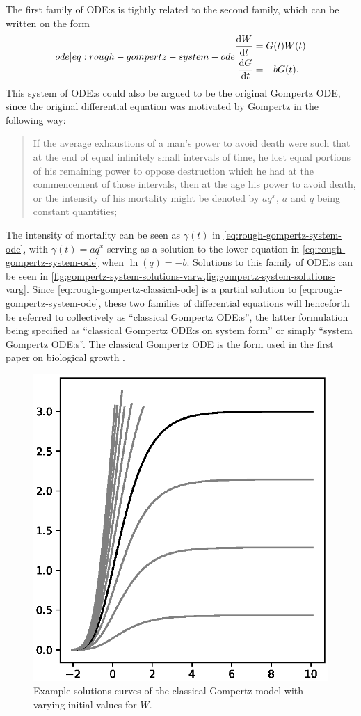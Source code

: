 The first family of ODE:s is tightly related to the second family, which can be written on the form
\begin{equation}
  \label[ode]{eq:rough-gompertz-system-ode}
  \begin{aligned} 
    \diff{W}{t} &= G(t) W(t)\\
    \diff{G}{t} &= -b G(t).
  \end{aligned}
\end{equation}
This system of ODE:s could also be argued to be the original Gompertz ODE, since the original differential equation  was motivated by Gompertz in the following way:
\blockquote[{\cite[518]{gompertz1825nature}}]{
  If the average exhaustions of a man's power to avoid death were such that at the end of equal infinitely small intervals of time, he lost equal portions of his remaining power to oppose destruction which he had at the commencement of those intervals, then at the age his power to avoid death, or the intensity of his mortality might be denoted by \(aq^x\), \(a\) and \(q\) being constant quantities;
}
The intensity of mortality can be seen as \(\gamma(t)\) in \cref{eq:rough-gompertz-system-ode}, with \(\gamma(t) = aq^x\) serving as a solution to the lower equation in \cref{eq:rough-gompertz-system-ode} when \(\ln\left(q\right) = -b\).
Solutions to this family of ODE:s can be seen in \cref{fig:gompertz-system-solutions-varw,fig:gompertz-system-solutions-varg}.
Since \cref{eq:rough-gompertz-classical-ode} is a partial solution to \cref{eq:rough-gompertz-system-ode}, these two families of differential equations will henceforth be referred to collectively as \enquote{classical Gompertz ODE:s}, the latter formulation being specified as \enquote{classical Gompertz ODE:s on system form} or simply \enquote{system Gompertz ODE:s}.
The classical Gompertz ODE is the form used in the first paper on biological growth \cite{davidson1928growth}.
\begin{figure}
  \centering
  \includegraphics[width=.32\textwidth]{images/gompertz-classical-solutions}
  \caption{Example solutions curves of the classical Gompertz model with varying initial values for \(W\).}
  \label{fig:gompertz-classical-solutions}
\end{figure}
